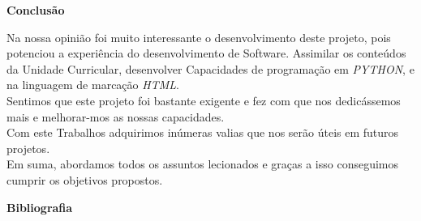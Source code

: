 \documentclass{article}
\begin{document}
\newpage
\centerline{\textbf{Conclusão}}
\vspace{5 em}

Na nossa opinião foi muito interessante o desenvolvimento deste projeto, pois potenciou a experiência do desenvolvimento de Software. Assimilar os conteúdos da Unidade Curricular, desenvolver Capacidades de programação em \textit{PYTHON}, e na linguagem de marcação \textit{HTML}.
\\

\vspace{1 em}
Sentimos que este projeto foi bastante exigente e fez com que nos dedicássemos mais e melhorar-mos as nossas capacidades.
\\

\vspace{1 em}
Com este Trabalhos adquirimos inúmeras valias que nos serão úteis em futuros projetos.
\\

\vspace{1 em}
Em suma, abordamos todos os assuntos lecionados e graças a isso conseguimos cumprir os objetivos propostos.
\\

\newpage

\centerline{\textbf{Bibliografia}}
\vspace{3 em}
\end{document}
